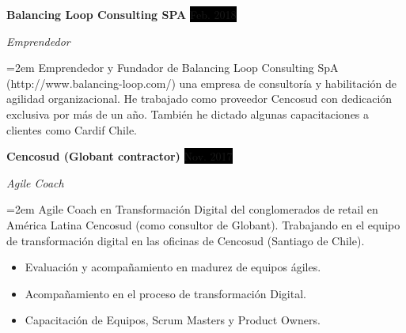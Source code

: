 \documentclass[paper=a4,fontsize=11pt]{scrartcl} %
\newcommand{\sepspace}{\vspace*{1em}}		%
\newcommand{\EducationEntry}[4]{
		\noindent \textbf{#1} \hfill      %
		\colorbox{Black}{%
			\parbox{6em}{%
			\hfill\color{White}#2}} \par  %
		\noindent \textit{#3} \par        %
		\noindent\hangindent=2em\hangafter=0 \small #4 %
		\normalsize \par}
\newcommand{\WorkEntry}[4]{				  %
		\noindent \textbf{#1} \hfill      %
		\colorbox{Black}{\color{White}#2} \par  %
		\noindent \textit{#3} \par              %
		\noindent\hangindent=2em\hangafter=0 \small #4 %
		\normalsize \par}
\begin{document}
\WorkEntry{Balancing Loop Consulting SPA}{Feb. 2018}{Emprendedor}{
Emprendedor y Fundador de Balancing Loop Consulting SpA (http://www.balancing-loop.com/) una empresa de consultoría y habilitación de agilidad organizacional. He trabajado como proveedor Cencosud con dedicación exclusiva por más de un año. También he dictado algunas capacitaciones a clientes como Cardif Chile.
}

\WorkEntry{Cencosud (Globant contractor)}{Nov. 2017}{Agile Coach}{
Agile Coach en Transformación Digital del conglomerados de retail en América Latina Cencosud (como consultor de Globant). Trabajando en el equipo de transformación digital en las oficinas de Cencosud (Santiago de Chile).
\begin{itemize}
\item Evaluación y acompañamiento en madurez de equipos ágiles.
\item Acompañamiento en el proceso de transformación Digital.
\item Capacitación de Equipos, Scrum Masters y Product Owners.
\end{itemize}
}

\sepspace
\end{document}
